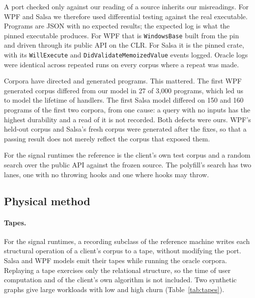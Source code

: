 \documentclass[11pt]{article}
\begin{document}
A port checked only against our reading of a source inherits our misreadings. For WPF and Salsa we therefore used differential testing \cite{mckeeman1998,claessen2000,yang2011} against the real executable. Programs are JSON with no expected results; the expected log is what the pinned executable produces. For WPF that is \texttt{WindowsBase} built from the pin and driven through its public API on the CLR. For Salsa it is the pinned crate, with its \texttt{WillExecute} and \texttt{DidValidateMemoizedValue} events logged. Oracle logs were identical across repeated runs on every corpus where a repeat was made.

Corpora have directed and generated programs. This mattered. The first WPF generated corpus differed from our model in 27 of 3{,}000 programs, which led us to model the lifetime of handlers. The first Salsa model differed on 150 and 160 programs of the first two corpora, from one cause: a query with no inputs has the highest durability and a read of it is not recorded. Both defects were ours. WPF's held-out corpus and Salsa's fresh corpus were generated after the fixes, so that a passing result does not merely reflect the corpus that exposed them.

For the signal runtimes the reference is the client's own test corpus and a random search over the public API against the frozen source. The polyfill's search has two lanes, one with no throwing hooks and one where hooks may throw.

\subsection{Physical method}

\paragraph{Tapes.} For the signal runtimes, a recording subclass of the reference machine writes each structural operation of a client's corpus to a tape, without modifying the port. Salsa and WPF models emit their tapes while running the oracle corpora. Replaying a tape exercises only the relational structure, so the time of user computation and of the client's own algorithm is not included. Two synthetic graphs give large workloads with low and high churn (Table~\ref{tab:tapes}).

\begin{table}[tbp]
\centering
\footnotesize

\caption{Operation tapes.}
\label{tab:tapes}
\end{table}
\end{document}
